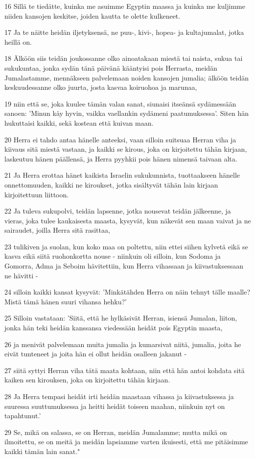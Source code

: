 \par 16 Sillä te tiedätte, kuinka me asuimme Egyptin maassa ja kuinka me kuljimme niiden kansojen keskitse, joiden kautta te olette kulkeneet.
\par 17 Ja te näitte heidän iljetyksensä, ne puu-, kivi-, hopea- ja kultajumalat, jotka heillä on.
\par 18 Älköön siis teidän joukossanne olko ainoatakaan miestä tai naista, sukua tai sukukuntaa, jonka sydän tänä päivänä kääntyisi pois Herrasta, meidän Jumalastamme, mennäkseen palvelemaan noiden kansojen jumalia; älköön teidän keskuudessanne olko juurta, josta kasvaa koiruohoa ja marunaa,
\par 19 niin että se, joka kuulee tämän valan sanat, siunaisi itseänsä sydämessään sanoen: 'Minun käy hyvin, vaikka vaellankin sydämeni paatumuksessa'. Siten hän hukuttaisi kaikki, sekä kostean että kuivan maan.
\par 20 Herra ei tahdo antaa hänelle anteeksi, vaan silloin suitsuaa Herran viha ja kiivaus sitä miestä vastaan, ja kaikki se kirous, joka on kirjoitettu tähän kirjaan, laskeutuu hänen päällensä, ja Herra pyyhkii pois hänen nimensä taivaan alta.
\par 21 Ja Herra erottaa hänet kaikista Israelin sukukunnista, tuottaakseen hänelle onnettomuuden, kaikki ne kiroukset, jotka sisältyvät tähän lain kirjaan kirjoitettuun liittoon.
\par 22 Ja tuleva sukupolvi, teidän lapsenne, jotka nousevat teidän jälkeenne, ja vieras, joka tulee kaukaisesta maasta, kysyvät, kun näkevät sen maan vaivat ja ne sairaudet, joilla Herra sitä rasittaa,
\par 23 tulikiven ja suolan, kun koko maa on poltettu, niin ettei siihen kylvetä eikä se kasva eikä siitä ruohonkortta nouse - niinkuin oli silloin, kun Sodoma ja Gomorra, Adma ja Seboim hävitettiin, kun Herra vihassaan ja kiivastuksessaan ne hävitti -
\par 24 silloin kaikki kansat kysyvät: 'Minkätähden Herra on näin tehnyt tälle maalle? Mistä tämä hänen suuri vihansa hehku?'
\par 25 Silloin vastataan: 'Siitä, että he hylkäsivät Herran, isiensä Jumalan, liiton, jonka hän teki heidän kanssansa viedessään heidät pois Egyptin maasta,
\par 26 ja menivät palvelemaan muita jumalia ja kumarsivat niitä, jumalia, joita he eivät tunteneet ja joita hän ei ollut heidän osalleen jakanut -
\par 27 siitä syttyi Herran viha tätä maata kohtaan, niin että hän antoi kohdata sitä kaiken sen kirouksen, joka on kirjoitettu tähän kirjaan.
\par 28 Ja Herra tempasi heidät irti heidän maastaan vihassa ja kiivastuksessa ja suuressa suuttumuksessa ja heitti heidät toiseen maahan, niinkuin nyt on tapahtunut.'
\par 29 Se, mikä on salassa, se on Herran, meidän Jumalamme; mutta mikä on ilmoitettu, se on meitä ja meidän lapsiamme varten ikuisesti, että me pitäisimme kaikki tämän lain sanat."

